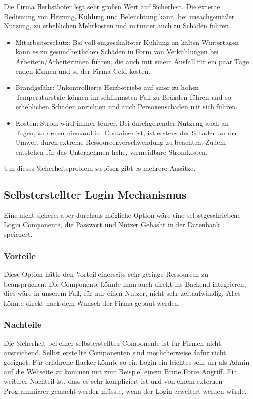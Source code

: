 Die Firma Herbsthofer legt sehr großen Wert auf Sicherheit. Die externe Bedienung von Heizung, Kühlung und Beleuchtung kann, bei unsachgemäßer Nutzung, zu erheblichen Mehrkosten und mitunter auch zu Schäden führen.

\begin{itemize}
\item Mitarbeiterschutz:
Bei voll eingeschalteter Kühlung an kalten Wintertagen kann es zu gesundheitlichen Schäden in Form von Verkühlungen bei Arbeitern/Arbeiterinnen führen, die auch mit einem Ausfall für ein paar Tage enden können und so der Firma Geld kosten.
\item Brandgefahr:
 Unkontrollierte Heizbetriebe auf einer zu hohen Temperaturstufe können im schlimmsten Fall zu Bränden führen und so erheblichen Schaden anrichten und auch Personenschaden mit sich führen.
\item Kosten: 
Strom wird immer teurer. Bei durchgehender Nutzung auch an Tagen, an denen niemand im Container ist, ist erstens der Schaden an der Umwelt durch extreme Ressourcenverschwendung zu beachten. Zudem entstehen für das Unternehmen hohe, vermeidbare Stromkosten.
\end{itemize}

Um dieses Sicherheitsproblem zu lösen gibt es mehrere Ansätze.

\subsection{Selbsterstellter Login Mechanismus}
Eine nicht sichere, aber durchaus mögliche Option wäre eine selbstgeschriebene Login Componente, die Passwort und Nutzer Gehasht in der Datenbank speichert. 
\subsubsection{Vorteile}
Diese Option hätte den Vorteil einerseits sehr geringe Ressourcen zu beanspruchen. Die Componente könnte man auch direkt ins Backend integrieren, dies wäre in unserem Fall, für nur einen Nutzer, nicht sehr zeitaufwändig. Alles könnte direkt nach dem Wunsch der Firma gebaut werden.
\subsubsection{Nachteile}
Die Sicherheit bei einer selbsterstellten Componente ist für Firmen nicht ausreichend. Selbst erstellte Componenten sind möglicherweise dafür nicht geeignet.
Für erfahrene Hacker könnte so ein Login ein leichtes sein um als Admin auf die Webseite zu kommen mit zum Beispiel einem Brute Force Angriff.
Ein weiterer Nachteil ist, dass es sehr kompliziert ist und von einem externen Programmierer gemacht werden müsste, wenn der Login erweitert werden würde.

